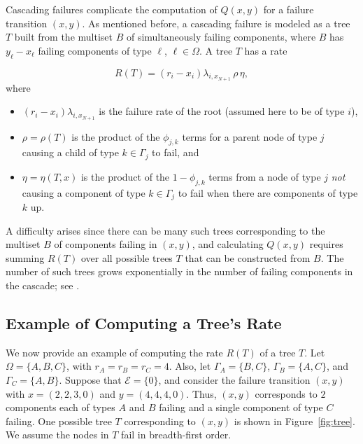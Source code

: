 \documentclass[12pt]{article}
\begin{document}
Cascading failures complicate the computation of $Q(x, y)$ for a failure
transition $(x, y)$. As mentioned before, a cascading failure is modeled as a
tree $T$ built from the multiset $B$ of simultaneously failing components, where
$B$ has $y_\ell - x_\ell$ failing components of type $\ell$, $\ell \in \Omega$.
A tree $T$ has a rate

\begin{equation}
\label{eq:rate}
R(T) = (r_i - x_i) \lambda_{i,x_{N + 1}} \, \rho \, \eta,
\end{equation}
where
\begin{itemize}
\item $(r_i - x_i) \lambda_{i,x_{N + 1}}$ is the failure rate of the root
(assumed here to be of type $i$),
\item $\rho = \rho(T)$ is the product of the
$\phi_{j, k}$ terms for a parent node of type $j$ causing a child of type $k \in
\Gamma_j$ to fail, and
\item $\eta = \eta(T,x)$ is the product of the $1 - \phi_{j, k}$ terms from a
node of type $j$ \textit{not} causing a component of type $k \in \Gamma_j$ to
fail when there are components of type $k$ up.
\end{itemize}

A difficulty arises since there can be many such trees corresponding to the
multiset $B$ of components failing in $(x, y)$, and calculating $Q(x, y)$
requires summing $R(T)$ over all possible trees $T$ that can be constructed from
$B$. The number of such trees grows exponentially in the number of failing
components in the cascade; see \cite{ING:2009}.

\subsection{Example of Computing a Tree's Rate}
\label{sec:exrate}

We now provide an example of computing the rate $R(T)$ of a tree $T$. Let
$\Omega = \{ A, B, C \}$, with $r_A = r_B = r_C = 4$. Also, let $\Gamma_A = \{
B, C \}$, $\Gamma_B = \{ A, C \}$, and $\Gamma_C = \{ A, B \}$. Suppose that
$\mathcal{E} = \{ 0 \}$, and consider the failure transition $(x, y)$ with $x =
(2, 2, 3, 0)$ and $y = (4, 4, 4, 0)$. Thus, $(x, y)$ corresponds to $2$
components each of types $A$ and $B$ failing and a single component of type $C$
failing. One possible tree $T$ corresponding to $(x, y)$ is shown in
Figure~\ref{fig:tree}. We assume the nodes in $T$ fail in breadth-first order.
\end{document}
